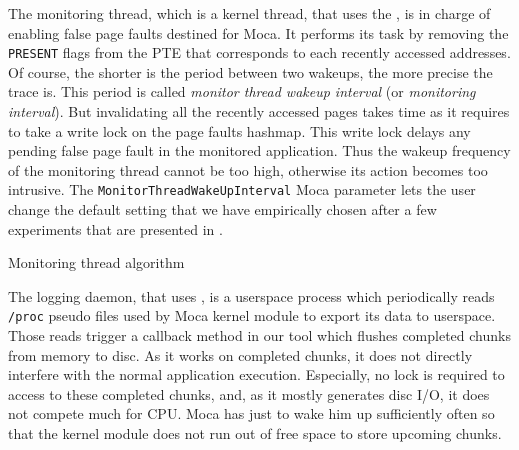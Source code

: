 The monitoring thread, which is a kernel thread, that uses the , is in charge of enabling false page faults destined for \gls{Moca}.
It performs its task by removing the \texttt{PRESENT} flags from the \gls{PTE} that corresponds to each recently accessed addresses.
Of course, the shorter is the period between two wakeups, the more precise the trace is.
This period is called \emph{monitor thread wakeup interval} (or \emph{monitoring interval}).
But invalidating all the recently accessed pages takes time as it requires to take a write lock on the page faults hashmap.
This write lock delays any pending false page fault in the monitored application.
Thus the wakeup frequency of the monitoring thread cannot be too high, otherwise its action becomes too intrusive.
The \texttt{MonitorThreadWakeUpInterval} \gls{Moca} parameter lets the user change the default setting that we have empirically chosen after a few experiments that are presented in .

\begin{algorithm}[htb]
    \caption{Monitoring thread algorithm}
    \label{alg:monTh}
    \begin{algorithmic}[1]
                \State {}
                        \State {}
                        \State {}
                        \State {}
                    \EndFor
                \State {}
            \EndFor
            \State {}
        \EndWhile
    \end{algorithmic}
\end{algorithm}

The logging daemon, that uses , is a userspace process which periodically reads \texttt{/proc} pseudo files used by \gls{Moca} kernel module to export its data to userspace.
Those reads trigger a callback method in our tool which flushes completed chunks from memory to disc.
As it works on completed chunks, it does not directly interfere with the normal application execution.
Especially, no lock is required to access to these completed chunks, and, as it mostly generates disc I/O, it does not compete much for CPU.
\gls{Moca} has just to wake him up sufficiently often so that the kernel module does not run out of free space to store upcoming chunks.

